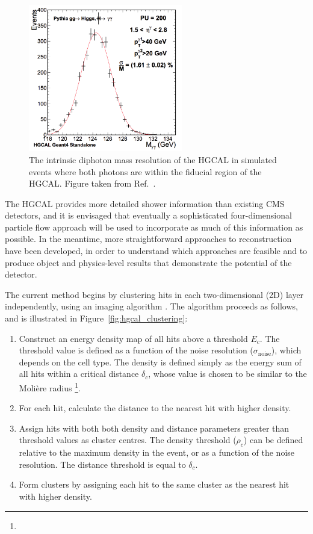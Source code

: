 \begin{figure}[h!]
  \centering
  \includegraphics[width=0.6\textwidth]{Figures/HGCAL/HggReso.png}
  \caption[HGCAL diphoton mass resolution.]
  {
    The intrinsic diphoton mass resolution of the HGCAL in simulated \Hgg events 
    where both photons are within the fiducial region of the HGCAL. 
    Figure taken from Ref.~\cite{HGCAL}.
  }
  \label{fig:hgcal_DiphotonReso}
\end{figure}

The HGCAL provides more detailed shower information than existing CMS detectors, 
and it is envisaged that eventually a sophisticated four-dimensional particle flow approach will be used to incorporate as much of this information as possible. 
In the meantime, more straightforward approaches to reconstruction have been developed, 
in order to understand which approaches are feasible and to produce object and physics-level results that demonstrate the potential of the detector. 

The current method begins by clustering hits in each two-dimensional (2D) layer independently, using an imaging algorithm \cite{ClusteringAlgo}.
The algorithm proceeds as follows, and is illustrated in Figure~\ref{fig:hgcal_clustering}:
\begin{enumerate}
  \item Construct an energy density map of all hits above a threshold $E_c$. 
  The threshold value is defined as a function of the noise resolution ($\sigma_{\textrm{noise}}$), which depends on the cell type.
  The density is defined simply as the energy sum of all hits within a critical distance $\delta_c$, 
  whose value is chosen to be similar to the Moli\`ere radius 
  \footnote{}. 
  \item For each hit, calculate the distance to the nearest hit with higher density.
  \item Assign hits with both both density and distance parameters greater than threshold values as cluster centres.
  The density threshold ($\rho_c$) can be defined relative to the maximum density in the event,
  or as a function of the noise resolution.
  The distance threshold is equal to $\delta_c$.
  \item Form clusters by assigning each hit to the same cluster as the nearest hit with higher density.
\end{enumerate}

